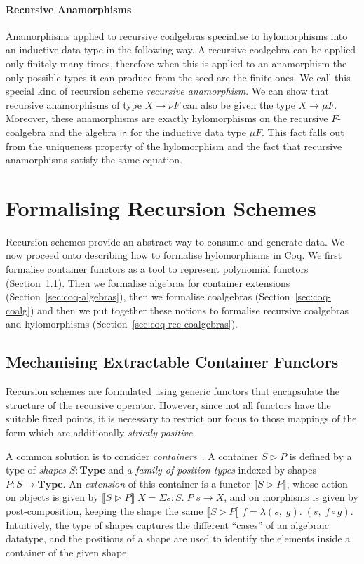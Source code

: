 \documentclass[a4paper,anonymous, UKenglish,cleveref, autoref, thm-restate]{lipics-v2021}
\newcommand{\operator}[1]{\textsf{#1}}
\newcommand{\InIso}{\operator{in}}
\newcommand{\Type}{\mathbf{Type}}
\begin{document}
\paragraph*{Recursive Anamorphisms}
Anamorphisms applied to recursive coalgebras specialise to hylomorphisms into an
inductive data type in the following way. A recursive coalgebra can be applied
only finitely many times, therefore when this is applied to an anamorphism the
only possible types it can produce from the seed are the finite ones. We call
this special kind of recursion scheme \emph{recursive anamorphism}. We can show
that recursive anamorphisms of type $X \to \nu F$ can also be given the type
$X \to \mu F$. Moreover, these anamorphisms are exactly hylomorphisms on the
recursive $F$-coalgebra and the algebra $\InIso$ for the inductive data type
$\mu F$. This fact falls out from the uniqueness property of the hylomorphism
and the fact that recursive anamorphisms satisfy the same equation.

\section{Formalising Recursion Schemes}
\label{sec:recursion-schemes}
Recursion schemes provide an abstract way to consume and generate data. We now
proceed onto describing how to formalise hylomorphisms in Coq. We first
formalise container functors as a tool to represent polynomial functors
(Section~\ref{sec:containers}). Then we formalise algebras for container
extensions (Section~\ref{sec:coq-algebras}), then we formalise coalgebras
(Section~\ref{sec:coq-coalg}) and then we put together these notions to
formalise recursive coalgebras and hylomorphisms
(Section~\ref{sec:coq-rec-coalgebras}).

\subsection{Mechanising Extractable Container Functors}
\label{sec:containers}
Recursion schemes are formulated using generic functors that encapsulate the
structure of the recursive operator. However, since not all functors have the
suitable fixed points, it is necessary to restrict our focus to those mappings
of the form  which are additionally \emph{strictly positive}.

A common solution is to consider \emph{containers}~\cite{AbbottAG05}.  A
container $S \triangleright P$ is defined by a type of \emph{shapes} $S : \Type$
and a \emph{family of position types} indexed by shapes $P : S \to \Type$.  An
\emph{extension} of this container is a functor
$\llbracket S \triangleright P \rrbracket$, whose action on objects is given by
$\llbracket S \triangleright P \rrbracket \; X = \Sigma s : S.\; P\;s \to X$,
and on morphisms is given by post-composition, keeping the shape the same
$\llbracket S \triangleright P \rrbracket \; f = \lambda (s,\;g).\;(s,\;f\circ g)$.
Intuitively, the type of shapes captures the different ``cases'' of an algebraic
datatype, and the positions of a shape are used to identify the elements inside
a container of the given shape.
\end{document}
